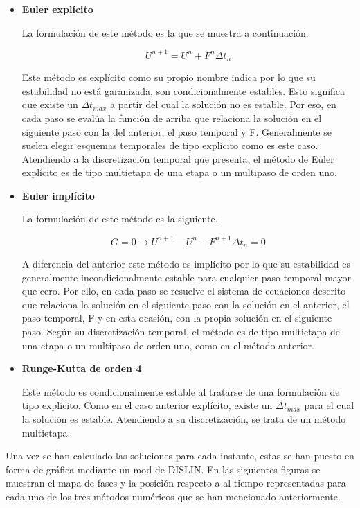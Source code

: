\documentclass{article}
\begin{document}
	\begin{itemize}
		\item \textbf{Euler explícito}
		
		La formulación de este método es la que se muestra a continuación.
		
		$$U^{n+1}=U^n+F^n\Delta t_n$$
		
		Este método es explícito como su propio nombre indica por lo que su estabilidad no está garanizada, son condicionalmente estables. Esto significa que existe un $\Delta t_{max}$ a partir del cual la solución no es estable. Por eso, en cada paso se evalúa la función de arriba que relaciona la solución en el siguiente paso con la del anterior, el paso temporal y F. Generalmente se suelen elegir esquemas temporales de tipo explícito como es este caso. Atendiendo a la discretización temporal que presenta, el método de Euler explícito es de tipo multietapa de una etapa o un multipaso de orden uno.
		
		\item \textbf{Euler implícito}
		
		La formulación de este método es la siguiente.
		
		$$G=0\rightarrow U^{n+1}-U^n-F^{n+1}\Delta t_n=0$$
		
		A diferencia del anterior este método es implícito por lo que su estabilidad es generalmente incondicionalmente estable para cualquier paso temporal mayor que cero. Por ello, en cada paso se resuelve el sistema de ecuaciones descrito que relaciona la solución en el siguiente paso con la solución en el anterior, el paso temporal, F y en esta ocasión, con la propia solución en el siguiente paso. Según su discretización temporal, el método es de tipo multietapa de una etapa o un multipaso de orden uno, como en el método anterior.
		
		\item \textbf{Runge-Kutta de orden 4}
		
		Este método es condicionalmente estable al tratarse de una formulación de tipo explícito. Como en el caso anterior explícito, existe un $\Delta t_{max}$ para el cual la solución es estable. Atendiendo a su discretización, se trata de un método multietapa.
		
	\end{itemize}

	Una vez se han calculado las soluciones para cada instante, estas se han puesto en forma de gráfica mediante un mod de DISLIN. En las siguientes figuras se muestran el mapa de fases y la posición respecto a al tiempo representadas para cada uno de los tres métodos numéricos que se han mencionado anteriormente.
	
\end{document}
